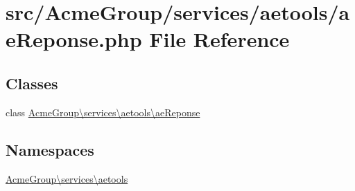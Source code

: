\hypertarget{ae_reponse_8php}{\section{src/\+Acme\+Group/services/aetools/ae\+Reponse.php File Reference}
\label{ae_reponse_8php}
}
\subsection*{Classes}
\begin{DoxyCompactItemize}
\item 
class \hyperlink{class_acme_group_1_1services_1_1aetools_1_1ae_reponse}{Acme\+Group\textbackslash{}services\textbackslash{}aetools\textbackslash{}ae\+Reponse}
\end{DoxyCompactItemize}
\subsection*{Namespaces}
\begin{DoxyCompactItemize}
\item 
 \hyperlink{namespace_acme_group_1_1services_1_1aetools}{Acme\+Group\textbackslash{}services\textbackslash{}aetools}
\end{DoxyCompactItemize}
